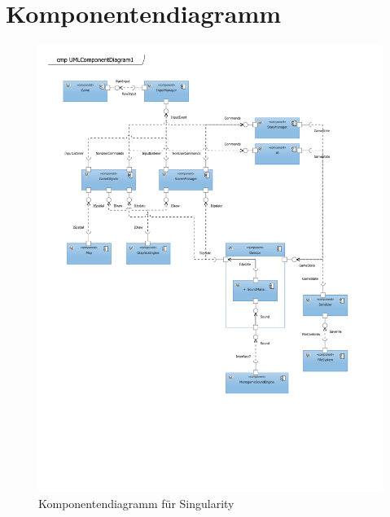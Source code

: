 \documentclass[12pt]{article}
\begin{document}
\newpage
\section{Komponentendiagramm}
\begin{figure}[h!]
	\centering
	\includegraphics[trim={0 5cm 0 0}, clip, width=\linewidth]{res/component.pdf}
	\caption{Komponentendiagramm für Singularity}
\end{figure}

\newpage
\end{document}
